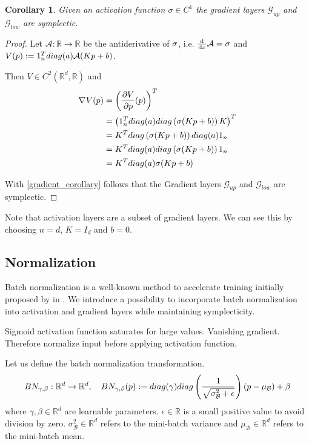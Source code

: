 \documentclass[twoside,a4paper]{article}
\newtheorem{corollary}{Corollary}
\begin{document}
\begin{corollary}
	Given an activation function $\sigma \in C^1$ the gradient layers $\mathcal{G}_{up}$
	and $\mathcal{G}_{low}$ are symplectic.
\end{corollary}
\begin{proof}
	Let $\mathcal{A}: \mathbb{R} \to \mathbb{R}$ be the antiderivative of $\sigma$, 
	i.e. $\frac{\mathrm{d}^{}}{\mathrm{d}x} \mathcal{A} = \sigma$ and
	$V(p) := 1_{n}^Tdiag(a)\mathcal{A}(Kp+b)$.

	Then $V \in C^2(\mathbb{R}^d, \mathbb{R})$ and
	\begin{align*}
		\nabla_{}{V(p)} &= \left(\frac{\partial V}{\partial p}(p)\right)^T \\
		&= \left(1_n^Tdiag(a)diag\left(\sigma(Kp+b)\right)K\right)^T \\
		&= K^Tdiag\left(\sigma(Kp+b)\right)diag(a)1_n \\
		&= K^Tdiag(a)diag\left(\sigma(Kp+b)\right)1_n \\
		&= K^Tdiag(a)\sigma(Kp+b)
	\end{align*}

	With \cref{gradient_corollary} follows that the Gradient layers
	$\mathcal{G}_{up}$ and $\mathcal{G}_{low}$ are symplectic.
\end{proof}

Note that activation layers are a subset of gradient layers. We can see this by choosing
$n=d$, $K=I_d$ and $b=0$.


\subsection{Normalization}


Batch normalization is a well-known method to accelerate training initially proposed by
\citeauthor{batchnorm-ioffe15} in \cite{batchnorm-ioffe15}. 
We introduce a possibility to incorporate batch normalization
into activation and gradient layers while maintaining symplecticity.

Sigmoid activation function saturates for large values. Vanishing gradient.
Therefore normalize input before applying activation function.

Let us define the batch normalization transformation.
\begin{equation*}
	BN_{\gamma, \beta} : \mathbb{R}^d \to \mathbb{R}^d,\quad
	BN_{\gamma, \beta}(p) 
	:= diag(\gamma)diag\left( \frac{1}{\sqrt{\sigma^2_\mathcal{B} + \epsilon}} \right) (p-\mu_\mathcal{B}) + \beta
\end{equation*}
where $\gamma, \beta \in \mathbb{R}^{d}$ are learnable parameters.
$\epsilon \in \mathbb{R}$ is a small positive value to avoid division by zero.
$\sigma^2_\mathcal{B} \in \mathbb{R}^{d}$ refers to the mini-batch variance and
$\mu_\mathcal{B} \in \mathbb{R}^{d}$ refers to the mini-batch mean.
\end{document}
